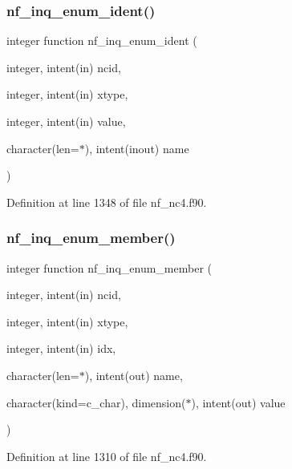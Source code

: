\subsubsection{\texorpdfstring{nf\+\_\+inq\+\_\+enum\+\_\+ident()}{nf\_inq\_enum\_ident()}}
{\footnotesize\ttfamily integer function nf\+\_\+inq\+\_\+enum\+\_\+ident (\begin{DoxyParamCaption}\item[{integer, intent(in)}]{ncid,  }\item[{integer, intent(in)}]{xtype,  }\item[{integer, intent(in)}]{value,  }\item[{character(len=$\ast$), intent(inout)}]{name }\end{DoxyParamCaption})}



Definition at line 1348 of file nf\+\_\+nc4.\+f90.

\mbox{\label{nf__nc4_8f90_a5a7fd353f04107f6f0ffbf17dc113e02}} 
\subsubsection{\texorpdfstring{nf\+\_\+inq\+\_\+enum\+\_\+member()}{nf\_inq\_enum\_member()}}
{\footnotesize\ttfamily integer function nf\+\_\+inq\+\_\+enum\+\_\+member (\begin{DoxyParamCaption}\item[{integer, intent(in)}]{ncid,  }\item[{integer, intent(in)}]{xtype,  }\item[{integer, intent(in)}]{idx,  }\item[{character(len=$\ast$), intent(out)}]{name,  }\item[{character(kind=c\+\_\+char), dimension($\ast$), intent(out)}]{value }\end{DoxyParamCaption})}



Definition at line 1310 of file nf\+\_\+nc4.\+f90.

\mbox{\label{nf__nc4_8f90_a40a10a8cf3a28c89236a937907af39cf}} 
